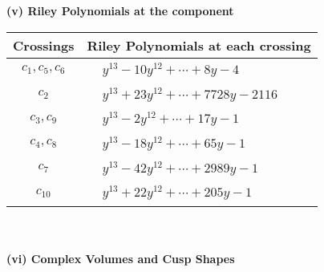 \documentclass[1p]{elsarticle_modified}
\theoremstyle{definition}
\begin{document}
\newpage\renewcommand{\arraystretch}{1}
\flushleft \textbf{(v) Riley Polynomials at the component}\newline \\
\begin{tabular}{m{50pt}|m{274pt}}
Crossings & \hspace{64pt}Riley Polynomials at each crossing \\
\hline $$\begin{aligned}c_{1},c_{5},c_{6}\end{aligned}$$&$\begin{aligned}
&y^{13}-10 y^{12}+\cdots+8 y-4
\end{aligned}$\\
\hline $$\begin{aligned}c_{2}\end{aligned}$$&$\begin{aligned}
&y^{13}+23 y^{12}+\cdots+7728 y-2116
\end{aligned}$\\
\hline $$\begin{aligned}c_{3},c_{9}\end{aligned}$$&$\begin{aligned}
&y^{13}-2 y^{12}+\cdots+17 y-1
\end{aligned}$\\
\hline $$\begin{aligned}c_{4},c_{8}\end{aligned}$$&$\begin{aligned}
&y^{13}-18 y^{12}+\cdots+65 y-1
\end{aligned}$\\
\hline $$\begin{aligned}c_{7}\end{aligned}$$&$\begin{aligned}
&y^{13}-42 y^{12}+\cdots+2989 y-1
\end{aligned}$\\
\hline $$\begin{aligned}c_{10}\end{aligned}$$&$\begin{aligned}
&y^{13}+22 y^{12}+\cdots+205 y-1
\end{aligned}$\\
\hline
\end{tabular}\\~\\
\newpage\flushleft \textbf{(vi) Complex Volumes and Cusp Shapes}
\end{document}
